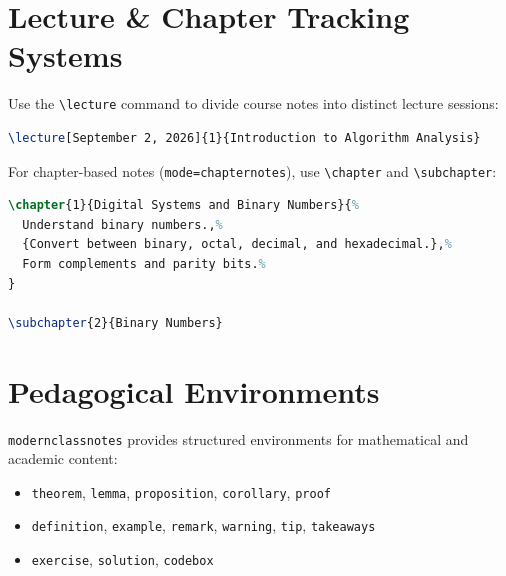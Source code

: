 \documentclass[mode=notes, palette=ocean, fontsize=11pt]{modernclassnotes}
\begin{document}
\section{Lecture \& Chapter Tracking Systems}

Use the \texttt{\textbackslash lecture} command to divide course notes into distinct lecture sessions:
\begin{codebox}
\begin{lstlisting}[language=TeX]
\lecture[September 2, 2026]{1}{Introduction to Algorithm Analysis}
\end{lstlisting}
\end{codebox}

For chapter-based notes (\texttt{mode=chapternotes}), use \texttt{\textbackslash chapter} and \texttt{\textbackslash subchapter}:
\begin{codebox}
\begin{lstlisting}[language=TeX]
\chapter{1}{Digital Systems and Binary Numbers}{%
  Understand binary numbers.,%
  {Convert between binary, octal, decimal, and hexadecimal.},%
  Form complements and parity bits.%
}

\subchapter{2}{Binary Numbers}
\end{lstlisting}
\end{codebox}

\section{Pedagogical Environments}

\begin{definition}
\texttt{modernclassnotes} provides structured environments for mathematical and academic content:
\begin{itemize}
    \item \texttt{theorem}, \texttt{lemma}, \texttt{proposition}, \texttt{corollary}, \texttt{proof}
    \item \texttt{definition}, \texttt{example}, \texttt{remark}, \texttt{warning}, \texttt{tip}, \texttt{takeaways}
    \item \texttt{exercise}, \texttt{solution}, \texttt{codebox}
\end{itemize}
\end{definition}
\end{document}
